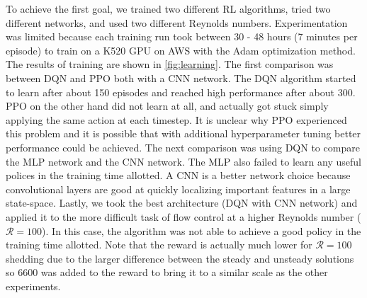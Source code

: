 \documentclass{article}
\begin{document}
To achieve the first goal, we trained two different RL algorithms, tried two different networks, and used two different Reynolds numbers. Experimentation was limited because each training run took between \num{30} - \num{48} hours (7 minutes per episode) to train on a K520 GPU on AWS with the Adam optimization method. The results of training are shown in \cref{fig:learning}. The first comparison was between DQN and PPO both with a CNN network. The DQN algorithm started to learn after about \num{150} episodes and reached high performance after about \num{300}. PPO on the other hand did not learn at all, and actually got stuck simply applying the same action at each timestep. It is unclear why PPO experienced this problem and it is possible that with additional hyperparameter tuning better performance could be achieved. The next comparison was using DQN to compare the MLP network and the CNN network. The MLP also failed to learn any useful polices in the training time allotted. A CNN is a better network choice because convolutional layers are good at quickly localizing important features in a large state-space. Lastly, we took the best architecture (DQN with CNN network) and applied it to the more difficult task of flow control at a higher Reynolds number ($\mathcal{R} = 100$). In this case, the algorithm was not able to achieve a good policy in the training time allotted. Note that the reward is actually much lower for $\mathcal{R} = 100$ shedding due to the larger difference between the steady and unsteady solutions so \num{6600} was added to the reward to bring it to a similar scale as the other experiments.
\end{document}
